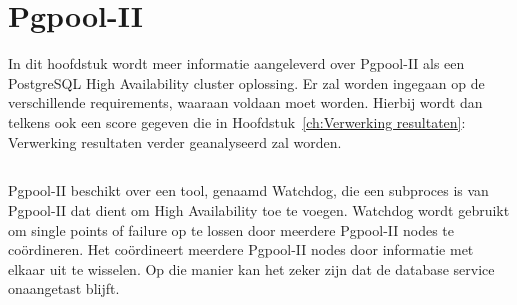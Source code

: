 
\chapter{Pgpool-II}
\label{ch:Pgpool-II}

In dit hoofdstuk wordt meer informatie aangeleverd over Pgpool-II als een PostgreSQL High Availability cluster oplossing. Er zal worden ingegaan op de verschillende requirements, waaraan voldaan moet worden. Hierbij wordt dan telkens ook een score gegeven die in Hoofdstuk~\ref{ch:Verwerking resultaten}: Verwerking resultaten verder geanalyseerd zal worden.

\section{}
\label{sec:Inleiding tot Pgpool-II}

\section{}
\label{sec:Requirements}

\subsection{}
\label{subsec:Must have}


\subsubsection{}
\label{subsubsec:Replicatie}

Pgpool-II beschikt over een tool, genaamd Watchdog, die een subproces is van Pgpool-II dat dient om High Availability toe te voegen. Watchdog wordt gebruikt om single points of failure op te lossen door meerdere Pgpool-II nodes te coördineren. Het coördineert meerdere Pgpool-II nodes door informatie met elkaar uit te wisselen. Op die manier kan het zeker zijn dat de database service onaangetast blijft.

